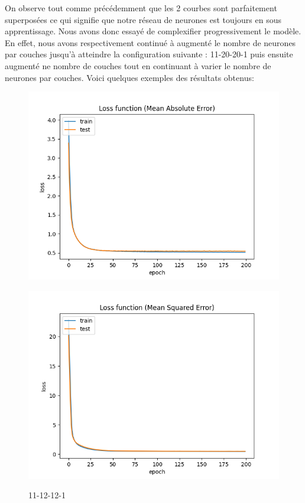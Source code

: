 \vspace{1cm}
\newpage
On observe tout comme précédemment que les 2 courbes sont parfaitement superposées ce qui signifie que notre réseau de neurones
est toujours en sous apprentissage. Nous avons donc essayé de complexifier progressivement le modèle. En effet, nous avons
respectivement continué à augmenté le nombre de neurones par couches jusqu'à atteindre la configuration suivante : 11-20-20-1 puis ensuite
augmenté ne nombre de couches tout en continuant à varier le nombre de neurones par couches. Voici quelques exemples des résultats obtenus:

\vspace{1cm}
\begin{figure}[!htb]
    \begin{minipage}{0.5\textwidth}
        \centering
        \includegraphics[width=01\textwidth]{../images/11-12-12/Loss_function(Mean_Absolute_Error).png}
        \label{fig:11-12-12-1.1}
    \end{minipage}\hfill
    \begin{minipage}{0.5\textwidth}
        \centering
        \includegraphics[width=01\textwidth]{../images/11-12-12/Loss_function(Mean_Squared_Error).png}
        \label{fig:11-12-12-1.1.2}
    \end{minipage}
    \caption{11-12-12-1}
\end{figure}

